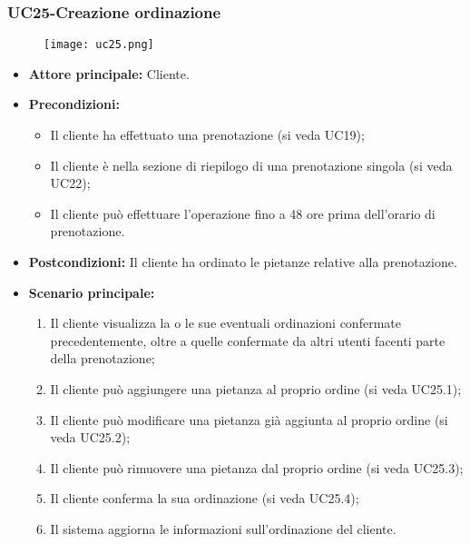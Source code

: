 \subsubsection{UC25-Creazione ordinazione}
\begin{figure}[h] \texttt{[image: uc25.png]} \end{figure}
\begin{itemize}
\item \textbf{Attore principale:} Cliente.
\item \textbf{Precondizioni:}
\begin{itemize}
    \item Il cliente ha effettuato una prenotazione (si veda UC19);
    \item Il cliente è nella sezione di riepilogo di una prenotazione singola (si veda UC22);
    \item Il cliente può effettuare l'operazione fino a 48 ore prima dell'orario di prenotazione.
\end{itemize}
\item \textbf{Postcondizioni:} Il cliente ha ordinato le pietanze relative alla prenotazione.
\item \textbf{Scenario principale:}
\begin{enumerate}
    \item Il cliente visualizza la o le sue eventuali ordinazioni confermate precedentemente, oltre a quelle confermate da altri utenti facenti parte della prenotazione;
    \item Il cliente può aggiungere una pietanza al proprio ordine (si veda UC25.1);
    \item Il cliente può modificare una pietanza già aggiunta al proprio ordine (si veda UC25.2);
    \item Il cliente può rimuovere una pietanza dal proprio ordine (si veda UC25.3);
    \item Il cliente conferma la sua ordinazione (si veda UC25.4);
    \item Il sistema aggiorna le informazioni sull'ordinazione del cliente.
\end{enumerate}
\end{itemize}

